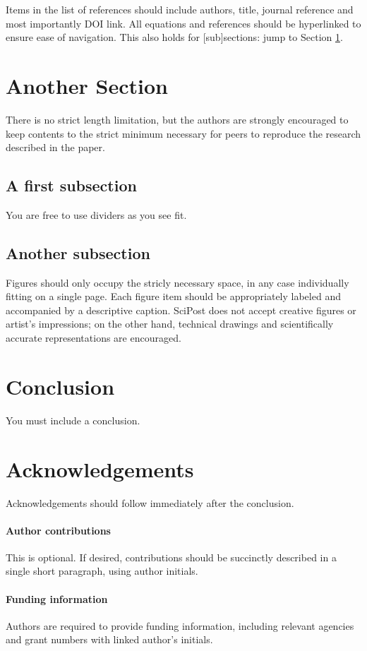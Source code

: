 \documentclass[submission]{SciPost}
\begin{document}
Items in the list of references\cite{1931_Bethe_ZP_71} should include authors, title, journal reference and most importantly DOI link. All equations and references should be hyperlinked to ensure ease of navigation. This also holds for [sub]sections: jump to Section \ref{sec:another}.

\section{Another Section}
\label{sec:another}
There is no strict length limitation, but the authors are strongly encouraged to keep contents to the strict minimum necessary for peers to reproduce the research described in the paper.

\subsection{A first subsection}
You are free to use dividers as you see fit.
\subsection{Another subsection}
Figures should only occupy the stricly necessary space, in any case individually fitting on a single page. Each figure item should be appropriately labeled and accompanied by a descriptive caption. SciPost does not accept creative figures or artist's impressions; on the other hand, technical drawings and scientifically accurate representations are encouraged.


\section{Conclusion}
You must include a conclusion.

\section*{Acknowledgements}
Acknowledgements should follow immediately after the conclusion. 

\paragraph{Author contributions}
This is optional. If desired, contributions should be succinctly described in a single short paragraph, using author initials.

\paragraph{Funding information}
Authors are required to provide funding information, including relevant agencies and grant numbers with linked author's initials.
\end{document}
